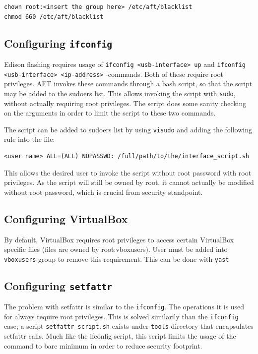 \documentclass[a4paper,11pt]{article}
\newcommand{\cmd}[1]{\texttt{#1}}
\begin{document}
\begin{lstlisting}
chown root:<insert the group here> /etc/aft/blacklist
chmod 660 /etc/aft/blacklist
\end{lstlisting}

\subsection*{Configuring \cmd{ifconfig}}

Edison flashing requires usage of \cmd{ifconfig <usb-interface> up} and \cmd{ifconfig <usb-interface> <ip-address>} -commands. Both of these require root privileges. AFT invokes these commands through a bash script, so that the script may be added to the sudoers list. This allows invoking the script with \cmd{sudo}, without actually requiring root privileges. The script does some sanity checking on the arguments in order to limit the script to these two commands. 

The script can be added to sudoers list by using \cmd{visudo}
and adding the following rule into the file:

\begin{lstlisting}
<user name> ALL=(ALL) NOPASSWD: /full/path/to/the/interface_script.sh
\end{lstlisting}
This allows the desired user to invoke the script without root password with root privileges. As the script will still be owned by root, it cannot actually be modified without root password, which is crucial from security standpoint. 

\subsection*{Configuring VirtualBox}
\label{virtualboxnoroot}

By default, VirtualBox requires root privileges to access certain VirtualBox specific files (files are owned by root:vboxusers). User must be added into \cmd{vboxusers}-group to remove this requirement. This can be done with \cmd{yast}

\subsection*{Configuring \cmd{setfattr}}
\label{virtualboxsetfattr}
The problem with setfattr is similar to the \cmd{ifconfig}. The operations it is used for always require root privileges. This is solved similarily than the \cmd{ifconfig} case; a script \cmd{setfattr\_script.sh} exists under \cmd{tools}-directory that encapsulates setfattr calls. Much like the ifconfig script, this script limits the usage of the command to bare minimum in order to reduce security footprint.
\end{document}
